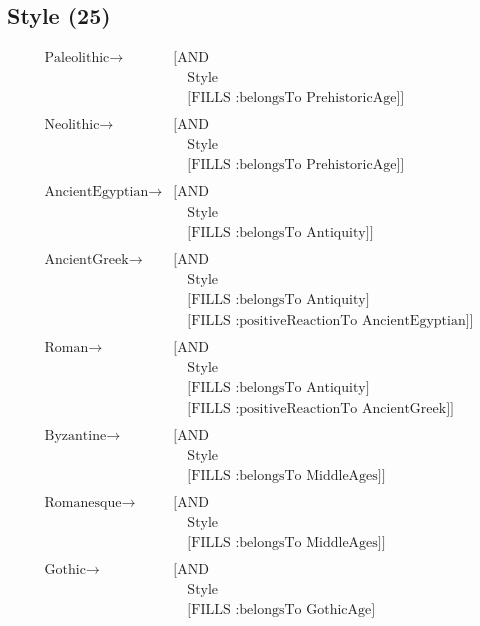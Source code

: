   \subsection{Style (25)}
    \begin{align*}
      \text{Paleolithic} \to& \text{[AND}\\
      &\quad\text{Style}\\
      &\quad\text{[FILLS :belongsTo PrehistoricAge]]}\\\\
      \text{Neolithic} \to& \text{[AND}\\
      &\quad\text{Style}\\
      &\quad\text{[FILLS :belongsTo PrehistoricAge]]}\\\\
      \text{AncientEgyptian} \to& \text{[AND}\\
      &\quad\text{Style}\\
      &\quad\text{[FILLS :belongsTo Antiquity]]}\\\\
      \text{AncientGreek} \to& \text{[AND}\\
      &\quad\text{Style}\\
      &\quad\text{[FILLS :belongsTo Antiquity]}\\
      &\quad\text{[FILLS :positiveReactionTo AncientEgyptian]]}\\\\
      \text{Roman} \to& \text{[AND}\\
      &\quad\text{Style}\\
      &\quad\text{[FILLS :belongsTo Antiquity]}\\
      &\quad\text{[FILLS :positiveReactionTo AncientGreek]]}\\\\
      \text{Byzantine} \to& \text{[AND}\\
      &\quad\text{Style}\\
      &\quad\text{[FILLS :belongsTo MiddleAges]]}\\\\
      \text{Romanesque} \to& \text{[AND}\\
      &\quad\text{Style}\\
      &\quad\text{[FILLS :belongsTo MiddleAges]]}\\\\
      \text{Gothic} \to& \text{[AND}\\
      &\quad\text{Style}\\
      &\quad\text{[FILLS :belongsTo GothicAge]}\\

\end{align*}
